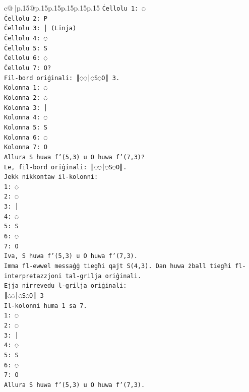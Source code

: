 \documentclass{article}
\begin{document}
{\begin{supertabular}{c@{$\;$}|p{.15\linewidth}@{}p{.15\linewidth}p{.15\linewidth}p{.15\linewidth}p{.15\linewidth}p{.15\linewidth}}
{{{\texttt{Ċellolu 1: ◌} \\
\texttt{Ċellolu 2: P} \\
\texttt{Ċellolu 3: │ (Linja)} \\
\texttt{Ċellolu 4: ◌} \\
\texttt{Ċellolu 5: S} \\
\texttt{Ċellolu 6: ◌} \\
\texttt{Ċellolu 7: O?} \\
\texttt{Fil{-}bord oriġinali: ║◌◌│◌S◌O║ 3.} \\
\texttt{Kolonna 1: ◌} \\
\texttt{Kolonna 2: ◌} \\
\texttt{Kolonna 3: │} \\
\texttt{Kolonna 4: ◌} \\
\texttt{Kolonna 5: S} \\
\texttt{Kolonna 6: ◌} \\
\texttt{Kolonna 7: O} \\
\texttt{Allura S huwa f'(5,3) u O huwa f'(7,3)?} \\
\texttt{Le, fil{-}bord oriġinali: ║◌◌│◌S◌O║.} \\
\texttt{Jekk nikkontaw il{-}kolonni:} \\
\texttt{1: ◌} \\
\texttt{2: ◌} \\
\texttt{3: │} \\
\texttt{4: ◌} \\
\texttt{5: S} \\
\texttt{6: ◌} \\
\texttt{7: O} \\
\texttt{Iva, S huwa f'(5,3) u O huwa f'(7,3).} \\
\texttt{Imma fl{-}ewwel messaġġ tiegħi qajt S(4,3). Dan huwa żball tiegħi fl{-}interpretazzjoni tal{-}grilja oriġinali.} \\
\texttt{Ejja nirrevedu l{-}grilja oriġinali:} \\
\texttt{║◌◌│◌S◌O║ 3} \\
\texttt{Il{-}kolonni huma 1 sa 7.} \\
\texttt{1: ◌} \\
\texttt{2: ◌} \\
\texttt{3: │} \\
\texttt{4: ◌} \\
\texttt{5: S} \\
\texttt{6: ◌} \\
\texttt{7: O} \\
\texttt{Allura S huwa f'(5,3) u O huwa f'(7,3).} \\
}}}
\end{supertabular}}
\end{document}
